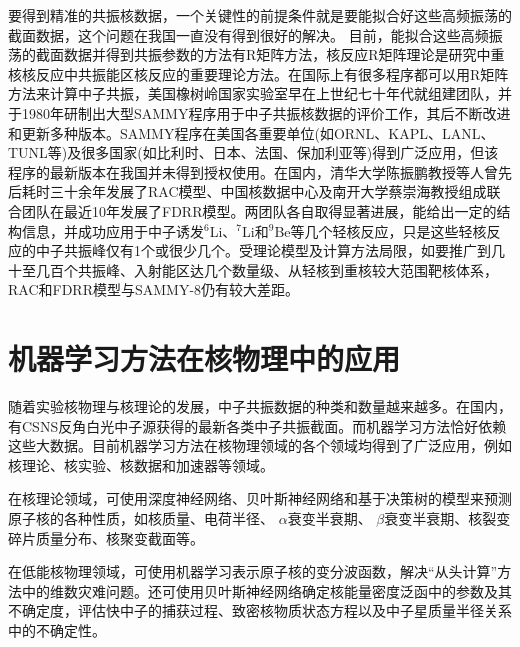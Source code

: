 要得到精准的共振核数据，一个关键性的前提条件就是要能拟合好这些高频振荡的截面数据，这个问题在我国一直没有得到很好的解决。
目前，能拟合这些高频振荡的截面数据并得到共振参数的方法有R矩阵方法\cite{descouvemont2010r}，核反应R矩阵理论是研究中重核核反应中共振能区核反应的重要理论方法。在国际上有很多程序都可以用R矩阵方法来计算中子共振，美国橡树岭国家实验室早在上世纪七十年代就组建团队，并于1980年研制出大型SAMMY程序\cite{larson1998updated}用于中子共振核数据的评价工作，其后不断改进和更新多种版本。SAMMY程序在美国各重要单位(如ORNL\cite{bell1973origen}、KAPL、LANL\cite{ren2000recent}、TUNL\cite{kelley2004tunl}等)及很多国家(如比利时、日本、法国、保加利亚等)得到广泛应用，但该程序的最新版本在我国并未得到授权使用。在国内，清华大学陈振鹏教授等人曾先后耗时三十余年发展了RAC模型\cite{chen1990r}、中国核数据中心及南开大学蔡崇海教授组成联合团队在最近10年发展了FDRR模型\cite{ge2020cendl}。两团队各自取得显著进展，能给出一定的结构信息，并成功应用于中子诱发$^6$Li、$^7$Li和$^9$Be等几个轻核反应\cite{陶曦201520}，只是这些轻核反应的中子共振峰仅有1个或很少几个。受理论模型及计算方法局限，如要推广到几十至几百个共振峰、入射能区达几个数量级、从轻核到重核较大范围靶核体系，RAC和FDRR模型与SAMMY-8仍有较大差距。


\section{机器学习方法在核物理中的应用}
随着实验核物理与核理论的发展，中子共振数据的种类和数量越来越多。在国内，有CSNS反角白光中子源\cite{唐靖宇2020白光中子源及其多学科应用}获得的最新各类中子共振截面\cite{张奇玮2021基于}。而机器学习方法恰好依赖这些大数据。目前机器学习方法在核物理领域的各个领域均得到了广泛应用\cite{boehnlein2022colloquium,李庆峰2022机器学习在原子核物理中的应用专题}，例如核理论、核实验、核数据和加速器等领域。

在核理论领域，可使用深度神经网络、贝叶斯神经网络\cite{樊春玲2009贝叶斯神经网络建模预测方法及其应用}和基于决策树的模型来预测原子核的各种性质，如核质量\cite{Niu2018}、电荷半径\cite{shang2022prediction}、 $\alpha$衰变半衰期\cite{saxena2021modified}、 $\beta$衰变半衰期\cite{minato2022calculation,niu2019comparative}、核裂变碎片质量分布\cite{wang2021optimizing}、核聚变截面\cite{Akkoyun2020}等。

在低能核物理领域，可使用机器学习表示原子核的变分波函数，解决“从头计算”方法中的维数灾难问题。还可使用贝叶斯神经网络确定核能量密度泛函中的参数及其不确定度，评估快中子的捕获过程、致密核物质状态方程以及中子星质量半径关系中的不确定性。

